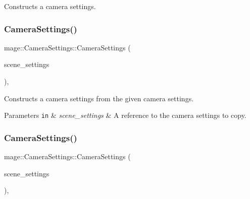 Constructs a camera settings. \hypertarget{classmage_1_1_camera_settings_a9122f443d253a17937e940883c201c6f}{}\label{classmage_1_1_camera_settings_a9122f443d253a17937e940883c201c6f} 
\subsubsection{\texorpdfstring{Camera\+Settings()}{CameraSettings()}\hspace{0.1cm}{\footnotesize\ttfamily [2/3]}}
{\footnotesize\ttfamily mage\+::\+Camera\+Settings\+::\+Camera\+Settings (\begin{DoxyParamCaption}\item[{const \hyperlink{classmage_1_1_camera_settings}{Camera\+Settings} \&}]{scene\+\_\+settings }\end{DoxyParamCaption})\hspace{0.3cm}{\ttfamily [default]}, {\ttfamily [noexcept]}}

Constructs a camera settings from the given camera settings.


\begin{DoxyParams}[1]{Parameters}
\mbox{\tt in}  & {\em scene\+\_\+settings} & A reference to the camera settings to copy. \\
\hline
\end{DoxyParams}
\hypertarget{classmage_1_1_camera_settings_aee7693137ac49fe16c184547bbb525bb}{}\label{classmage_1_1_camera_settings_aee7693137ac49fe16c184547bbb525bb} 
\subsubsection{\texorpdfstring{Camera\+Settings()}{CameraSettings()}\hspace{0.1cm}{\footnotesize\ttfamily [3/3]}}
{\footnotesize\ttfamily mage\+::\+Camera\+Settings\+::\+Camera\+Settings (\begin{DoxyParamCaption}\item[{\hyperlink{classmage_1_1_camera_settings}{Camera\+Settings} \&\&}]{scene\+\_\+settings }\end{DoxyParamCaption})\hspace{0.3cm}{\ttfamily [default]}, {\ttfamily [noexcept]}}

